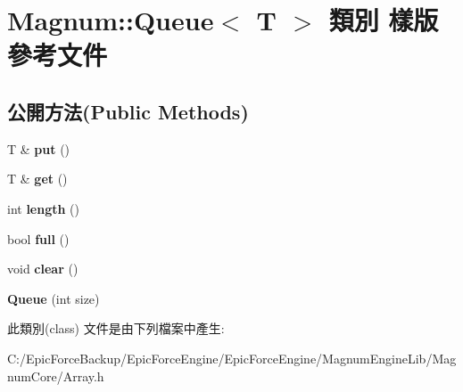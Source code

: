 \hypertarget{class_magnum_1_1_queue}{}\section{Magnum\+:\+:Queue$<$ T $>$ 類別 樣版 參考文件}
\label{class_magnum_1_1_queue}
\subsection*{公開方法(Public Methods)}
\begin{DoxyCompactItemize}
\item 
T \& {\bfseries put} ()\hypertarget{class_magnum_1_1_queue_a40f0dab3d9a109f2ac1226668b17a5b4}{}\label{class_magnum_1_1_queue_a40f0dab3d9a109f2ac1226668b17a5b4}

\item 
T \& {\bfseries get} ()\hypertarget{class_magnum_1_1_queue_a0901e1699a9ea53caa769082e6090be4}{}\label{class_magnum_1_1_queue_a0901e1699a9ea53caa769082e6090be4}

\item 
int {\bfseries length} ()\hypertarget{class_magnum_1_1_queue_abf4e236c84e0ea93d3b68ec71fe9df84}{}\label{class_magnum_1_1_queue_abf4e236c84e0ea93d3b68ec71fe9df84}

\item 
bool {\bfseries full} ()\hypertarget{class_magnum_1_1_queue_a83b45fbe5ab2a77f909307485eb91837}{}\label{class_magnum_1_1_queue_a83b45fbe5ab2a77f909307485eb91837}

\item 
void {\bfseries clear} ()\hypertarget{class_magnum_1_1_queue_a2ed13ac82d161a99117632ea8e3f15ad}{}\label{class_magnum_1_1_queue_a2ed13ac82d161a99117632ea8e3f15ad}

\item 
{\bfseries Queue} (int size)\hypertarget{class_magnum_1_1_queue_aab3ddc152a22bcaba797e498fdb83c65}{}\label{class_magnum_1_1_queue_aab3ddc152a22bcaba797e498fdb83c65}

\end{DoxyCompactItemize}


此類別(class) 文件是由下列檔案中產生\+:\begin{DoxyCompactItemize}
\item 
C\+:/\+Epic\+Force\+Backup/\+Epic\+Force\+Engine/\+Epic\+Force\+Engine/\+Magnum\+Engine\+Lib/\+Magnum\+Core/Array.\+h\end{DoxyCompactItemize}
